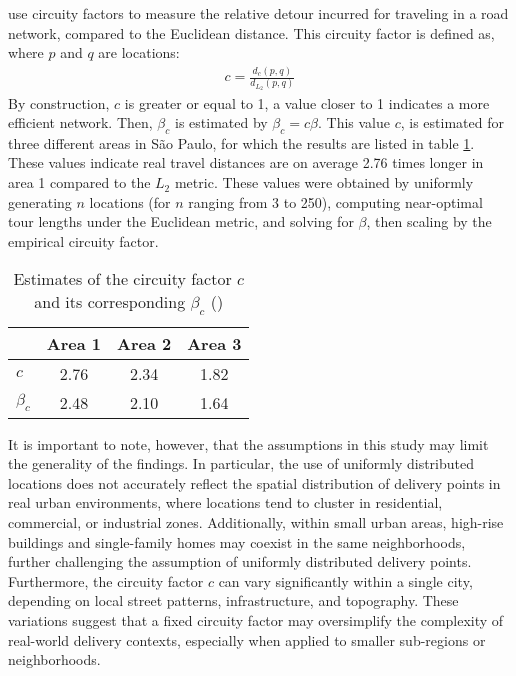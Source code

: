 \documentclass[12pt]{article}
\numberwithin{equation}{section}
\newcommand{\1}[1]{\,I_{#1}} %
\begin{document}
\cite{merchan2019empirical} use circuity factors to measure the relative detour incurred for
traveling in a road network, compared to the Euclidean distance. This circuity factor is defined
as, where $p$ and $q$ are locations:
\begin{align}
	c = \frac{d_{c}(p,q)}{d_{L_{2}}(p,q)}
	\label{eq:circuity}
\end{align}
By construction, $c$ is greater or equal to 1, a value closer to 1 indicates a more efficient network. Then, $\beta_c$
is estimated by $\beta_c=c\beta$. This value $c$, is estimated for three different areas in
São Paulo, for which the results are listed in table \ref{tab:beta-merchan}. These values indicate
real travel distances are on average 2.76 times longer in area 1 compared to the $L_2$ metric.
These values were obtained by uniformly generating $n$ locations (for $n$ ranging from 3 to 250),
computing near-optimal tour lengths under the Euclidean metric, and solving for $\beta$, then
scaling by the empirical circuity factor.
\begin{table}[htbp]
	\centering
	\caption{Estimates of the circuity factor $c$ and its corresponding $\beta_c$ (\cite{merchan2019empirical})}
	\label{tab:beta-merchan}
	\begin{tabular}{lccc}
		\toprule
		          & Area 1 & Area 2 & Area 3 \\
		\midrule
		$c$       & 2.76   & 2.34   & 1.82   \\
		$\beta_c$ & 2.48   & 2.10   & 1.64   \\
		\bottomrule
	\end{tabular}
\end{table}
It is important to note, however, that the assumptions in this study may limit the generality of
the findings. In particular, the use of uniformly distributed locations does not accurately reflect
the spatial distribution of delivery points in real urban environments, where locations tend to
cluster in residential, commercial, or industrial zones. Additionally, within small urban areas,
high-rise buildings and single-family homes may coexist in the same neighborhoods, further
challenging the assumption of uniformly distributed delivery points.
Furthermore, the circuity factor $c$ can
vary significantly within a single city, depending on local street patterns, infrastructure, and
topography. These variations suggest that a fixed circuity factor may oversimplify the complexity
of real-world delivery contexts, especially when applied to smaller sub-regions or neighborhoods.
\end{document}

